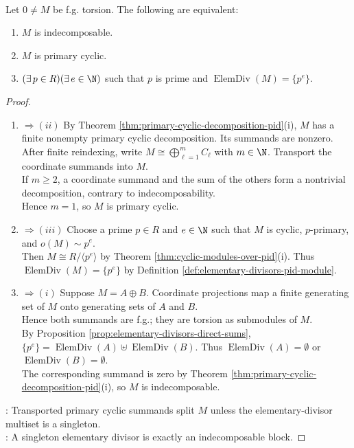\begin{theorem} \label{thm:indecomposable-fg-torsion-pid-modules} \\
Let $0\neq M$ be f.g. torsion. The following are equivalent:
\begin{enumerate}[label=(\roman*)]
\setlength{\itemsep}{0pt}
\item $M$ is indecomposable.
\item $M$ is primary cyclic.
\item $(\exists\,p\in R)(\exists\,e\in\N)$ such that $p$ is prime and $\operatorname{ElemDiv}(M)=\{p^e\}$.
\end{enumerate}
\begin{proof}
\begin{enumerate}[label=(\roman*)]
\setlength{\itemsep}{0pt}
\item[$(i)$]$\Rightarrow (ii)$ By Theorem \ref{thm:primary-cyclic-decomposition-pid}(i), $M$ has a finite nonempty primary cyclic decomposition. Its summands are nonzero.\\
After finite reindexing, write $M\cong\bigoplus\limits_{\ell=1}^mC_\ell$ with $m\in\N$. Transport the coordinate summands into $M$.\\
If $m\geq2$, a coordinate summand and the sum of the others form a nontrivial decomposition, contrary to indecomposability.\\
Hence $m=1$, so $M$ is primary cyclic.
\item[$(ii)$]$\Rightarrow (iii)$ Choose a prime $p\in R$ and $e\in\N$ such that $M$ is cyclic, $p$-primary, and $o(M)\sim p^e$.\\
Then $M\cong R/\langle p^e\rangle$ by Theorem \ref{thm:cyclic-modules-over-pid}(i). Thus $\operatorname{ElemDiv}(M)=\{p^e\}$ by Definition \ref{def:elementary-divisors-pid-module}.
\item[$(iii)$]$\Rightarrow (i)$ Suppose $M=A\oplus B$. Coordinate projections map a finite generating set of $M$ onto generating sets of $A$ and $B$.\\
Hence both summands are f.g.; they are torsion as submodules of $M$.\\
By Proposition \ref{prop:elementary-divisors-direct-sums}, $\{p^e\}=\operatorname{ElemDiv}(A)\uplus\operatorname{ElemDiv}(B)$. Thus $\operatorname{ElemDiv}(A)=\emptyset$ or $\operatorname{ElemDiv}(B)=\emptyset$.\\
The corresponding summand is zero by Theorem \ref{thm:primary-cyclic-decomposition-pid}(i), so $M$ is indecomposable.
\end{enumerate}
: Transported primary cyclic summands split $M$ unless the elementary-divisor multiset is a singleton.\\
: A singleton elementary divisor is exactly an indecomposable block.
\end{proof}
\end{theorem}
